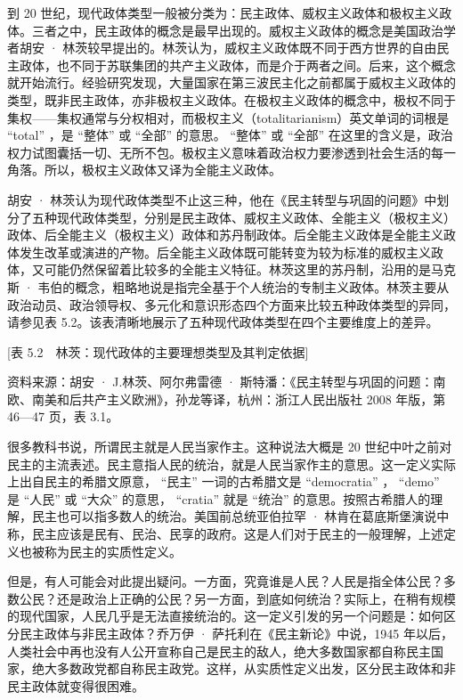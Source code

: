 到 20 世纪，现代政体类型一般被分类为：民主政体、威权主义政体和极权主义政体。三者之中，民主政体的概念是最早出现的。威权主义政体的概念是美国政治学者胡安 · 林茨较早提出的。林茨认为，威权主义政体既不同于西方世界的自由民主政体，也不同于苏联集团的共产主义政体，而是介于两者之间。后来，这个概念就开始流行。经验研究发现，大量国家在第三波民主化之前都属于威权主义政体的类型，既非民主政体，亦非极权主义政体。在极权主义政体的概念中，极权不同于集权——集权通常与分权相对，而极权主义（totalitarianism）英文单词的词根是 “total” ，是 “整体” 或 “全部” 的意思。 “整体” 或 “全部” 在这里的含义是，政治权力试图囊括一切、无所不包。极权主义意味着政治权力要渗透到社会生活的每一角落。所以，极权主义政体又译为全能主义政体。

胡安 · 林茨认为现代政体类型不止这三种，他在《民主转型与巩固的问题》中划分了五种现代政体类型，分别是民主政体、威权主义政体、全能主义（极权主义）政体、后全能主义（极权主义）政体和苏丹制政体。后全能主义政体是全能主义政体发生改革或演进的产物。后全能主义政体既可能转变为较为标准的威权主义政体，又可能仍然保留着比较多的全能主义特征。林茨这里的苏丹制，沿用的是马克斯 · 韦伯的概念，粗略地说是指完全基于个人统治的专制主义政体。林茨主要从政治动员、政治领导权、多元化和意识形态四个方面来比较五种政体类型的异同，请参见表 5.2。该表清晰地展示了五种现代政体类型在四个主要维度上的差异。

[表 5.2　林茨：现代政体的主要理想类型及其判定依据]



资料来源：胡安 · J.林茨、阿尔弗雷德 · 斯特潘：《民主转型与巩固的问题：南欧、南美和后共产主义欧洲》，孙龙等译，杭州：浙江人民出版社 2008 年版，第 46—47 页，表 3.1。


很多教科书说，所谓民主就是人民当家作主。这种说法大概是 20 世纪中叶之前对民主的主流表述。民主意指人民的统治，就是人民当家作主的意思。这一定义实际上出自民主的希腊文原意， “民主” 一词的古希腊文是 “democratia” ， “demo” 是 “人民” 或 “大众” 的意思， “cratia” 就是 “统治” 的意思。按照古希腊人的理解，民主也可以指多数人的统治。美国前总统亚伯拉罕 · 林肯在葛底斯堡演说中称，民主应该是民有、民治、民享的政府。这是人们对于民主的一般理解，上述定义也被称为民主的实质性定义。

但是，有人可能会对此提出疑问。一方面，究竟谁是人民？人民是指全体公民？多数公民？还是政治上正确的公民？另一方面，到底如何统治？实际上，在稍有规模的现代国家，人民几乎是无法直接统治的。这一定义引发的另一个问题是：如何区分民主政体与非民主政体？乔万伊 · 萨托利在《民主新论》中说，1945 年以后，人类社会中再也没有人公开宣称自己是民主的敌人，绝大多数国家都自称民主国家，绝大多数政党都自称民主政党。这样，从实质性定义出发，区分民主政体和非民主政体就变得很困难。

